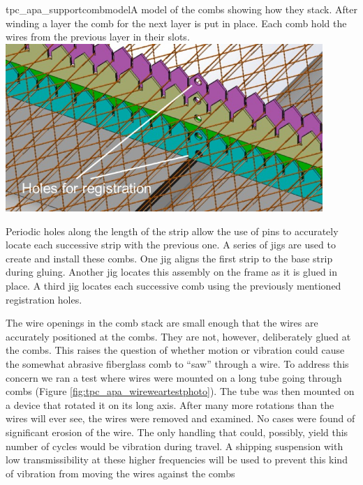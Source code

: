 \begin{cdrfigure}{tpc_apa_supportcombmodel}{A model of the combs showing how they stack.  After winding a layer the comb for the next layer is put in place.  Each comb hold the wires from the previous layer in their slots.}
\includegraphics[width=0.9\textwidth]{figures/tpc_apa_supportcombmodel.png} 
\end{cdrfigure}

Periodic holes along the length of the strip allow the use of pins to accurately locate each successive strip with the previous one.  A series of jigs are used to create and install these combs.  One jig aligns the first strip to the base strip during gluing.  Another jig locates this assembly on the frame as it is glued in place. A third jig locates each successive comb using the previously mentioned registration holes.

The wire openings in the comb stack are small enough that the wires are accurately positioned at the combs.  They are not, however, deliberately glued at the combs.  This raises the question of whether motion or vibration could cause the somewhat abrasive fiberglass comb to ``saw'' through a wire.  To address this concern we ran a test where wires were mounted on a long tube going through combs (Figure \ref{fig:tpc_apa_wireweartestphoto}).  The tube was then mounted on a device that rotated it on its long axis.  After many more rotations than the wires will ever see, the wires were removed and examined.  No cases were found of significant erosion of the wire.  The only handling that could, possibly, yield this number of cycles would be vibration during travel.  A shipping suspension with low transmissibility at these higher frequencies will be used to prevent this kind of vibration from moving the wires against the combs

